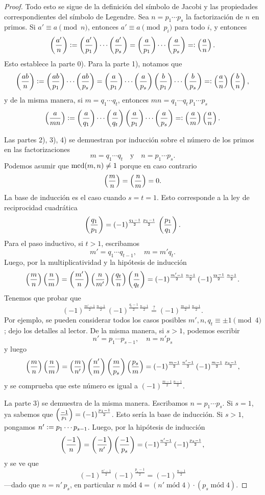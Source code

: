 \documentclass{article}
\theoremstyle{plain}
\begin{document}
\begin{proposicion}
  \begin{proof}
    Todo esto se sigue de la definición del símbolo de Jacobi y las propiedades
    correspondientes del símbolo de Legendre. Sea $n = p_1\cdots p_s$ la
    factorización de $n$ en primos. Si $a' \equiv a \pmod{n}$, entonces
    $a' \equiv a \pmod{p_i}$ para todo $i$, y entonces
    $$\left(\frac{a'}{n}\right) \mathrel{\mathop:}= \left(\frac{a'}{p_1}\right)\cdots\left(\frac{a'}{p_s}\right) = \left(\frac{a}{p_1}\right)\cdots\left(\frac{a}{p_s}\right) =\mathrel{\mathop:} \left(\frac{a}{n}\right).$$
    Esto establece la parte 0). Para la parte 1), notamos que
    $$\left(\frac{ab}{n}\right) \mathrel{\mathop:}= \left(\frac{ab}{p_1}\right)\cdots\left(\frac{ab}{p_s}\right) = \left(\frac{a}{p_1}\right)\cdots\left(\frac{a}{p_s}\right)\left(\frac{b}{p_1}\right)\cdots\left(\frac{b}{p_s}\right) =\mathrel{\mathop:} \left(\frac{a}{n}\right)\left(\frac{b}{n}\right),$$
    y de la misma manera, si $m = q_1\cdots q_t$, entonces
    $mn = q_1\cdots q_t\,p_1\cdots p_s$
    $$\left(\frac{a}{mn}\right) \mathrel{\mathop:}= \left(\frac{a}{q_1}\right)\cdots\left(\frac{a}{q_t}\right)\left(\frac{a}{p_1}\right)\cdots\left(\frac{a}{p_s}\right) =\mathrel{\mathop:} \left(\frac{a}{m}\right)\left(\frac{a}{n}\right).$$

    Las partes 2), 3), 4) se demuestran por inducción sobre el número de los
    primos en las factorizaciones
    $$m = q_1\cdots q_t\quad\text{y}\quad n = p_1\cdots p_s.$$
    Podemos asumir que $\operatorname{mcd} (m,n) \ne 1$ porque en caso contrario
    $$\left(\frac{m}{n}\right) = \left(\frac{n}{m}\right) = 0.$$
    La base de inducción es el caso cuando $s = t = 1$. Esto corresponde a la
    ley de reciprocidad cuadrática
    $$\left(\frac{q_1}{p_1}\right) = (-1)^{\frac{q_1-1}{2}\,\frac{p_1-1}{2}}\,\left(\frac{p_1}{q_1}\right).$$
    Para el paso inductivo, si $t > 1$, escribamos
    $$m' = q_1\cdots q_{t-1},\quad m = m' q_t.$$
    Luego, por la multiplicatividad y la hipótesis de inducción
    $$\left(\frac{m}{n}\right)\left(\frac{n}{m}\right) = \left(\frac{m'}{n}\right)\left(\frac{n}{m'}\right)\left(\frac{q_t}{n}\right)\left(\frac{n}{q_t}\right) = (-1)^{\frac{m'-1}{2}\,\frac{n-1}{2}}\,(-1)^{\frac{q_t-1}{2}\,\frac{n-1}{2}}.$$
    Tenemos que probar que
    $$(-1)^{\frac{m'-1}{2}\,\frac{n-1}{2}}\,(-1)^{\frac{q_t-1}{2}\,\frac{n-1}{2}} \stackrel{?}{=} (-1)^{\frac{m-1}{2}\,\frac{n-1}{2}}.$$
    Por ejemplo, se pueden considerar todos los casos posibles
    $m', n, q_t \equiv \pm 1 \pmod{4}$; dejo los detalles al lector. De la misma
    manera, si $s > 1$, podemos escribir
    $$n' = p_1\cdots p_{s-1},\quad n = n' p_s$$
    y luego
    $$\left(\frac{m}{n}\right)\left(\frac{n}{m}\right) = \left(\frac{m}{n'}\right)\left(\frac{n'}{m}\right)\left(\frac{m}{p_s}\right)\left(\frac{p_s}{m}\right) = (-1)^{\frac{m-1}{2}\,\frac{n'-1}{2}} \, (-1)^{\frac{m-1}{2}\,\frac{p_s-1}{2}},$$
    y se comprueba que este número es igual a
    $(-1)^{\frac{m-1}{2}\,\frac{n-1}{2}}$.

    La parte 3) se demuestra de la misma manera. Escribamos
    $n = p_1\cdots p_s$. Si $s = 1$, ya sabemos que
    $\left(\frac{-1}{p_1}\right) = (-1)^{\frac{p_1-1}{2}}$. Esto sería la base de
    inducción. Si $s > 1$, pongamos $n' \mathrel{\mathop:}= p_1\cdots p_{s-1}$. Luego, por la
    hipótesis de inducción
    $$\left(\frac{-1}{n}\right) = \left(\frac{-1}{n'}\right)\left(\frac{-1}{p_s}\right) = (-1)^{\frac{n'-1}{2}}\,(-1)^{\frac{p_s-1}{2}},$$
    y se ve que
    $$(-1)^{\frac{n'-1}{2}}\,(-1)^{\frac{p_s-1}{2}} = (-1)^{\frac{n-1}{2}}$$
    ---dado que $n = n'\,p_s$, en particular
    $n \operatorname{\text{mód}} 4 = (n' \operatorname{\text{mód}} 4)\cdot (p_s\operatorname{\text{mód}} 4)$.


\end{proof}
\end{proposicion}
\end{document}
